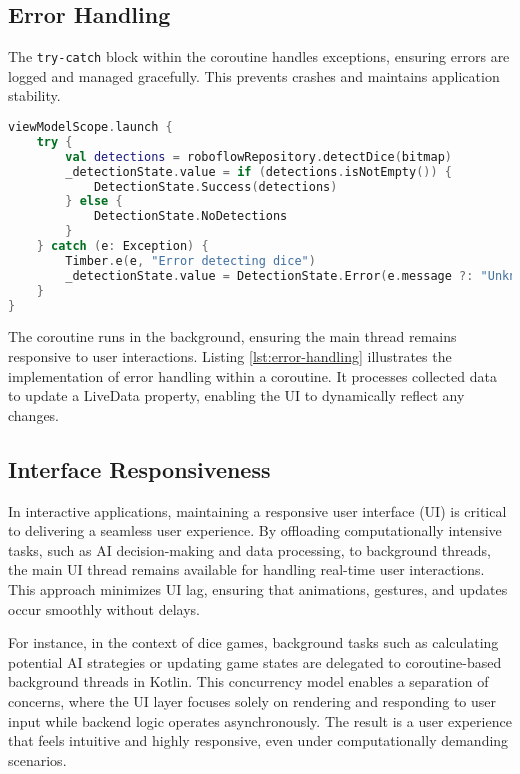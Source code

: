 \subsection{Error Handling}

The \texttt{try-catch} block within the coroutine handles exceptions, ensuring errors are logged and managed gracefully. This prevents crashes and maintains application stability.
\begin{lstlisting}[language=Kotlin, caption={Error Handling in Coroutines}, label=lst:error_handling_coroutine]
viewModelScope.launch {
    try {
        val detections = roboflowRepository.detectDice(bitmap)
        _detectionState.value = if (detections.isNotEmpty()) {
            DetectionState.Success(detections)
        } else {
            DetectionState.NoDetections
        }
    } catch (e: Exception) {
        Timber.e(e, "Error detecting dice")
        _detectionState.value = DetectionState.Error(e.message ?: "Unknown error")
    }
}
\end{lstlisting}
\label{lst:error_handling_coroutine}

The coroutine runs in the background, ensuring the main thread remains responsive to user interactions. Listing \ref{lst:error-handling} illustrates the implementation of error handling within a coroutine. It processes collected data to update a LiveData property, enabling the UI to dynamically reflect any changes.

\subsection{Interface Responsiveness}

In interactive applications, maintaining a responsive user interface (UI) is critical to delivering a seamless user experience. By offloading computationally intensive tasks, such as AI decision-making and data processing, to background threads, the main UI thread remains available for handling real-time user interactions. This approach minimizes UI lag, ensuring that animations, gestures, and updates occur smoothly without delays.

For instance, in the context of dice games, background tasks such as calculating potential AI strategies or updating game states are delegated to coroutine-based background threads in Kotlin. This concurrency model enables a separation of concerns, where the UI layer focuses solely on rendering and responding to user input while backend logic operates asynchronously. The result is a user experience that feels intuitive and highly responsive, even under computationally demanding scenarios.

